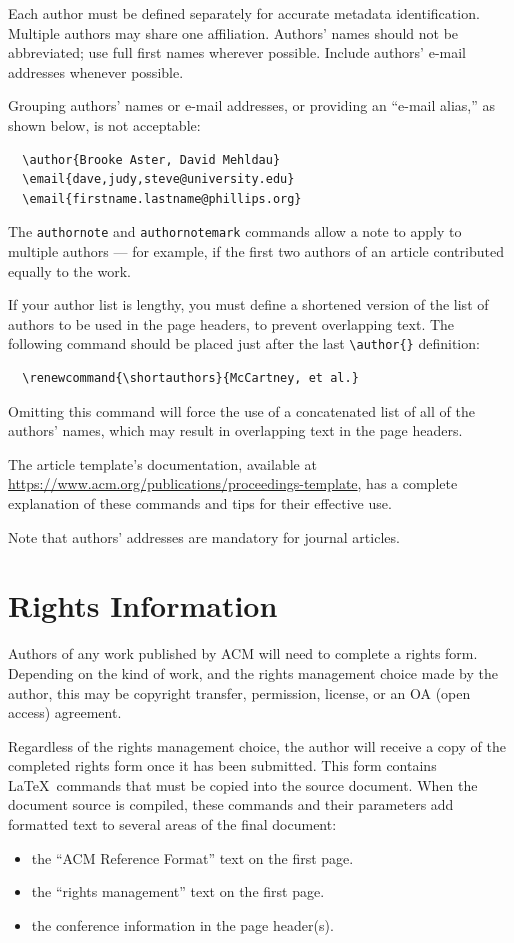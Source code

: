 \documentclass[sigconf]{acmart}
\begin{document}
Each author must be defined separately for accurate metadata
identification. Multiple authors may share one affiliation. Authors'
names should not be abbreviated; use full first names wherever
possible. Include authors' e-mail addresses whenever possible.

Grouping authors' names or e-mail addresses, or providing an ``e-mail
alias,'' as shown below, is not acceptable:
\begin{verbatim}
  \author{Brooke Aster, David Mehldau}
  \email{dave,judy,steve@university.edu}
  \email{firstname.lastname@phillips.org}
\end{verbatim}

The \verb|authornote| and \verb|authornotemark| commands allow a note
to apply to multiple authors --- for example, if the first two authors
of an article contributed equally to the work.

If your author list is lengthy, you must define a shortened version of
the list of authors to be used in the page headers, to prevent
overlapping text. The following command should be placed just after
the last \verb|\author{}| definition:
\begin{verbatim}
  \renewcommand{\shortauthors}{McCartney, et al.}
\end{verbatim}
Omitting this command will force the use of a concatenated list of all
of the authors' names, which may result in overlapping text in the
page headers.

The article template's documentation, available at
\url{https://www.acm.org/publications/proceedings-template}, has a
complete explanation of these commands and tips for their effective
use.

Note that authors' addresses are mandatory for journal articles.

\section{Rights Information}

Authors of any work published by ACM will need to complete a rights
form. Depending on the kind of work, and the rights management choice
made by the author, this may be copyright transfer, permission,
license, or an OA (open access) agreement.

Regardless of the rights management choice, the author will receive a
copy of the completed rights form once it has been submitted. This
form contains \LaTeX\ commands that must be copied into the source
document. When the document source is compiled, these commands and
their parameters add formatted text to several areas of the final
document:
\begin{itemize}
\item the ``ACM Reference Format'' text on the first page.
\item the ``rights management'' text on the first page.
\item the conference information in the page header(s).
\end{itemize}
\end{document}
